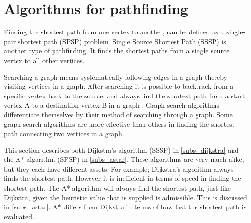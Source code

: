 \section{Algorithms for pathfinding}

Finding the shortest path from one vertex to another, can be defined as a single-pair shortest path (SPSP) problem. Single Source Shortest Path (SSSP) is another type of pathfinding. It finds the shortest paths from a single source vertex to all other vertices.

Searching a graph means systematically following edges in a graph thereby visiting vertices in a graph. After searching it is possible to backtrack from a specific vertex back to the source, and always find the shortest path from a start vertex A to a destination vertex B in a graph \cite{Cormen2009}. Graph search algorithms differentiate themselves by their method of searching through a graph. Some graph search algorithms are more effective than others in finding the shortest path connecting two vertices in a graph. 

This section describes both Dijkstra's algorithm (SSSP) in \cref{subs_dijkstra} and the A* algorithm (SPSP) in \cref{subs_astar}. These algorithms are very much alike, but they each have different assets. For example; Dijkstra's algorithm always finds the shortest path. However it is inefficient in terms of speed in finding the shortest path. The A* algorithm will always find the shortest path, just like Dijkstra, given the heuristic value that is supplied is admissible. This is discussed in \cref{subs_astar}. A* differs from Dijkstra in terms of how fast the shortest path is evaluated.




